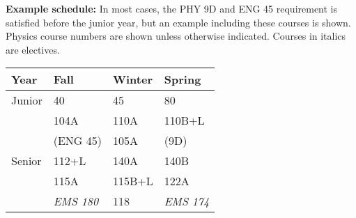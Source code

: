 \documentclass[12pt]{article}
\begin{document}
\noindent
{\bf Example schedule:} In most cases, the PHY 9D and ENG 45 requirement is
satisfied before the junior year, but an example including these courses is
shown.  Physics course numbers are shown unless otherwise indicated.
Courses in italics are electives.
\begin{center}
\begin{tabular}{|l|l|l|l|}
\hline
Year      & Fall    & Winter & Spring \\
\hline
Junior    & 40         & 45           & 80 \\
          & 104A       & 110A         & 110B+L \\
          & (ENG 45)   & 105A         & (9D) \\         
\hline
Senior   & 112+L          & 140A   & 140B \\
         & 115A           & 115B+L & 122A \\
         & {\it EMS 180}  & 118   & {\it EMS 174} \\
\hline
\end{tabular}
\end{center}
\end{document}
